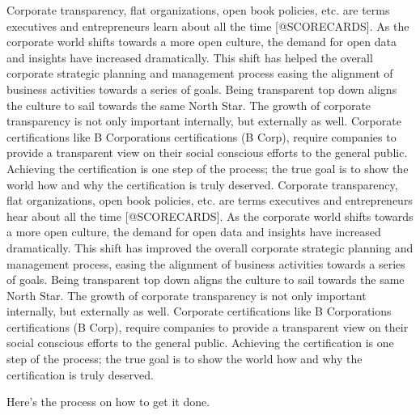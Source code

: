 \documentclass[]{book}
\theoremstyle{definition}
\theoremstyle{definition}
\theoremstyle{definition}
\theoremstyle{remark}
\begin{document}
Corporate transparency, flat organizations, open book policies, etc. are
terms executives and entrepreneurs learn about all the time
{[}@SCORECARDS{]}. As the corporate world shifts towards a more open
culture, the demand for open data and insights have increased
dramatically. This shift has helped the overall corporate strategic
planning and management process easing the alignment of business
activities towards a series of goals. Being transparent top down aligns
the culture to sail towards the same North Star. The growth of corporate
transparency is not only important internally, but externally as well.
Corporate certifications like B Corporations certifications (B Corp),
require companies to provide a transparent view on their social
conscious efforts to the general public. Achieving the certification is
one step of the process; the true goal is to show the world how and why
the certification is truly deserved. Corporate transparency, flat
organizations, open book policies, etc. are terms executives and
entrepreneurs hear about all the time {[}@SCORECARDS{]}. As the
corporate world shifts towards a more open culture, the demand for open
data and insights have increased dramatically. This shift has improved
the overall corporate strategic planning and management process, easing
the alignment of business activities towards a series of goals. Being
transparent top down aligns the culture to sail towards the same North
Star. The growth of corporate transparency is not only important
internally, but externally as well. Corporate certifications like B
Corporations certifications (B Corp), require companies to provide a
transparent view on their social conscious efforts to the general
public. Achieving the certification is one step of the process; the true
goal is to show the world how and why the certification is truly
deserved.

Here's the process on how to get it done.
\end{document}
